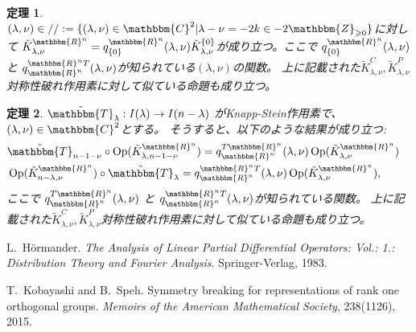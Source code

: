 \documentclass[a4paper,10pt]{article} %
\newcommand{\assign}{:=}
\newcommand{\tmop}[1]{\ensuremath{\operatorname{#1}}}
\newcommand{\tmtextit}[1]{{\itshape{#1}}}
\newtheorem{theorem}{定理}
\begin{document}
\begin{theorem}
  $(\lambda, \nu) \in / / \assign \{ (\lambda, \nu) \in \mathbbm{C}^2 |
  \lambda - \nu = - 2 k \in - 2\mathbbm{Z}_{\geqslant 0} \}$に対して
  $\tilde{K}^{\mathbbm{R}^n}_{\lambda, \nu} = q_{\{ 0 \}}^{\mathbbm{R}^n}
  (\lambda, \nu) \tilde{K}^{\{ 0 \}}_{\lambda, \nu}$が成り立つ。ここで
  $q^{\mathbbm{R}^n}_{\{ 0 \}} (\lambda, \nu)$ と $q^{\mathbbm{R}^n
  T}_{\mathbbm{R}^n} (\lambda, \nu)$が知られている$(\lambda,\nu)$の関数。
  上に記載された$\tilde{K}_{\lambda, \nu}^C, \tilde{K}_{\lambda, \nu}^P$対称性破れ作用素に対して似ている命題も成り立つ。
\end{theorem}

\begin{theorem}
  $\tilde{\mathbbm{T}}_{\lambda} : I (\lambda) \rightarrow I (n -
  \lambda)$ がKnapp-Stein作用素で、$(\lambda, \nu) \in \mathbbm{C}^2$とする。
  そうすると、以下のような結果が成り立つ:
  \begin{eqnarray}
    & \tilde{\mathbbm{T}}_{n - 1 - \nu} \circ \tmop{Op} (\tilde{K}_{\lambda,
    n - 1 - \nu}^{\mathbbm{R}^n}) = q^{T\mathbbm{R}^n}_{\mathbbm{R}^n}
    (\lambda, \nu) \tmop{Op} (\tilde{K}_{\lambda, \nu}^{\mathbbm{R}^n}) & 
    \nonumber\\
    & \tmop{Op} (\tilde{K}_{n - \lambda, \nu}^{\mathbbm{R}^n}) \circ
    \tilde{\mathbbm{T}}_{\lambda} = q^{\mathbbm{R}^n T}_{\mathbbm{R}^n}
    (\lambda, \nu) \tmop{Op} (\tilde{K}_{\lambda, \nu}^{\mathbbm{R}^n}), & 
    \nonumber
  \end{eqnarray}
  ここで $q^{T\mathbbm{R}^n}_{\mathbbm{R}^n} (\lambda, \nu)$ と
  $q^{\mathbbm{R}^n T}_{\mathbbm{R}^n} (\lambda, \nu)$が知られている関数。
  上に記載された$\tilde{K}_{\lambda, \nu}^C, \tilde{K}_{\lambda, \nu}^P$対称性破れ作用素に対して似ている命題も成り立つ。
\end{theorem}

\begin{thebibliography}{Hör83}
  L.~H{\"o}rmander.
  {\newblock}\tmtextit{The Analysis of Linear Partial Differential Operators:
  Vol.: 1.: Distribution Theory and Fourier Analysis}.
  {\newblock}Springer-Verlag, 1983.
  
  T.~Kobayashi and B.~Speh.
  {\newblock}Symmetry breaking for representations of rank one orthogonal
  groups. {\newblock}\tmtextit{Memoirs of the American Mathematical Society},
  238(1126), 2015.
\end{thebibliography}
\end{document}
